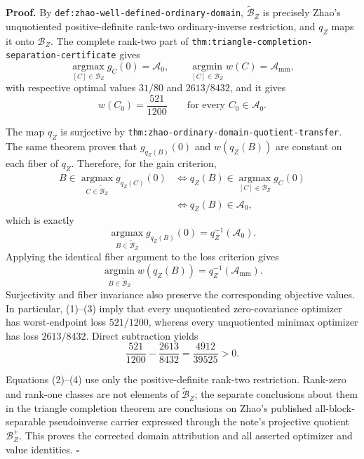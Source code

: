 \textbf{Proof.}
By \texttt{def:zhao-well-defined-ordinary-domain}, \(\widetilde{\mathcal B}_Z\) is precisely Zhao's unquotiented positive-definite rank-two ordinary-inverse restriction, and \(q_Z\) maps it onto \(\mathcal B_Z\).  The complete rank-two part of \texttt{thm:triangle-completion-separation-certificate} gives
\[
\operatorname*{argmax}_{[C]\in\mathcal B_Z}g_C(0)=\mathcal A_0,
\qquad
\operatorname*{argmin}_{[C]\in\mathcal B_Z}w(C)=\mathcal A_{\mathrm{mm}},
\]
with respective optimal values \(31/80\) and \(2613/8432\), and it gives
\[
w(C_0)=\frac{521}{1200}
\qquad\text{for every }C_0\in\mathcal A_0.
\tag{1}
\]

The map \(q_Z\) is surjective by \texttt{thm:zhao-ordinary-domain-quotient-transfer}.  The same theorem proves that \(g_{q_Z(B)}(0)\) and \(w(q_Z(B))\) are constant on each fiber of \(q_Z\).  Therefore, for the gain criterion,
\[
\begin{aligned}
B\in\operatorname*{argmax}_{C\in\widetilde{\mathcal B}_Z}g_{q_Z(C)}(0)
&\Longleftrightarrow
q_Z(B)\in\operatorname*{argmax}_{[C]\in\mathcal B_Z}g_C(0)\\
&\Longleftrightarrow q_Z(B)\in\mathcal A_0,
\end{aligned}
\]
which is exactly
\[
\operatorname*{argmax}_{B\in\widetilde{\mathcal B}_Z}g_{q_Z(B)}(0)
=q_Z^{-1}(\mathcal A_0).
\tag{2}
\]
Applying the identical fiber argument to the loss criterion gives
\[
\operatorname*{argmin}_{B\in\widetilde{\mathcal B}_Z}w(q_Z(B))
=q_Z^{-1}(\mathcal A_{\mathrm{mm}}).
\tag{3}
\]
Surjectivity and fiber invariance also preserve the corresponding objective values.  In particular, (1)--(3) imply that every unquotiented zero-covariance optimizer has worst-endpoint loss \(521/1200\), whereas every unquotiented minimax optimizer has loss \(2613/8432\).  Direct subtraction yields
\[
\frac{521}{1200}-\frac{2613}{8432}
=\frac{4912}{39525}>0.
\tag{4}
\]

Equations (2)--(4) use only the positive-definite rank-two restriction.  Rank-zero and rank-one classes are not elements of \(\widetilde{\mathcal B}_Z\); the separate conclusions about them in the triangle completion theorem are conclusions on Zhao's published all-block-separable pseudoinverse carrier expressed through the note's projective quotient \(\mathcal B_Z^+\).  This proves the corrected domain attribution and all asserted optimizer and value identities. \(\square\)